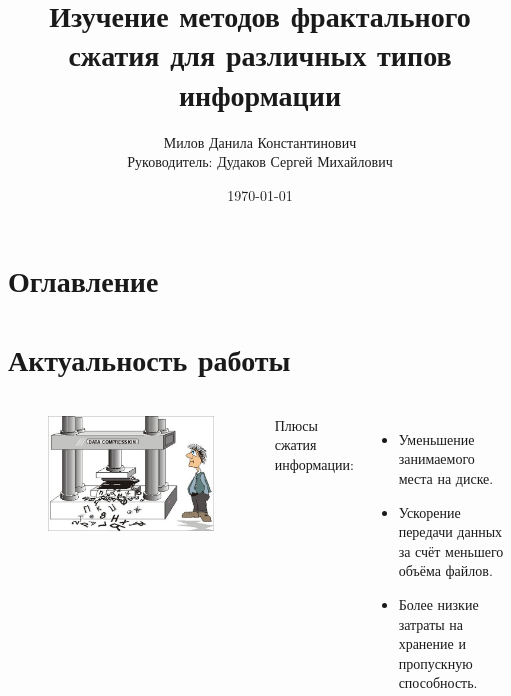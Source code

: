 \documentclass[t aspectratio=169]{beamer}
\title{Изучение методов фрактального сжатия для различных типов информации}
\author[author1]{Милов Данила Константинович\\[10mm]{\small Руководитель: Дудаков Сергей Михайлович}}
\date{\today}
\begin{document}
  \begin{frame}
    \maketitle
  \end{frame}

  \section*{Оглавление}
  \begin{frame}\frametitle{\insertsection}
    \large
    \tableofcontents
    \normalfont
  \end{frame}

  \section{Актуальность работы}
  \begin{frame}\frametitle{\insertsection}
    \begin{columns}
      \begin{figure}
        \begin{center}
          \includegraphics[width=1\textwidth]{./images/compression-illustration.jpg}
        \end{center}
      \end{figure}
      \large Плюсы сжатия информации:
      \begin{itemize}
        \item Уменьшение занимаемого места на диске.
        \item Ускорение передачи данных за счёт меньшего объёма файлов.
        \item Более низкие затраты на хранение и пропускную способность.
      \end{itemize}
    \normalsize
    \end{columns}
  \end{frame}
\end{document}
